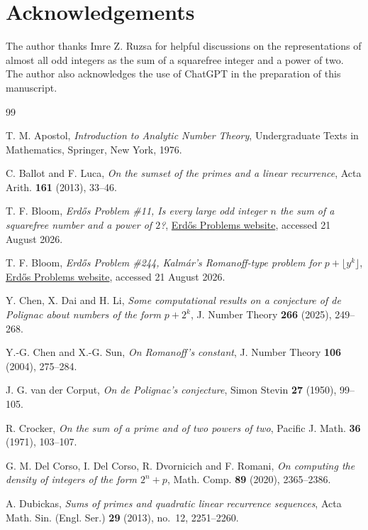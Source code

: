 \documentclass[11pt,reqno]{amsart}
\numberwithin{equation}{section}
\begin{document}
    \section*{Acknowledgements}
    The author thanks Imre Z. Ruzsa for helpful discussions on the representations of almost all odd integers as the sum of a squarefree integer and a power of two. The author also acknowledges the use of ChatGPT in the preparation of this manuscript.

    \begin{thebibliography}{99}

    T. M. Apostol, \emph{Introduction to Analytic Number Theory}, Undergraduate Texts in Mathematics, Springer, New York, 1976.

    C. Ballot and F. Luca, \emph{On the sumset of the primes and a linear recurrence}, Acta Arith. \textbf{161} (2013), 33--46.

    T. F. Bloom, \emph{Erd\H{o}s Problem \#11, Is every large odd integer $n$ the sum of a squarefree number and a power of $2$?}, \href{https://www.erdosproblems.com/11}{Erd\H{o}s Problems website}, accessed 21 August 2026.

    T. F. Bloom, \emph{Erd\H{o}s Problem \#244, Kalm\'ar's Romanoff-type problem for $p+\lfloor y^k\rfloor$}, \href{https://www.erdosproblems.com/244}{Erd\H{o}s Problems website}, accessed 21 August 2026.

    Y. Chen, X. Dai and H. Li, \emph{Some computational results on a conjecture of de Polignac about numbers of the form $p+2^k$}, J. Number Theory \textbf{266} (2025), 249--268.

    Y.-G. Chen and X.-G. Sun, \emph{On Romanoff's constant}, J. Number Theory \textbf{106} (2004), 275--284.

    J. G. van der Corput, \emph{On de Polignac's conjecture}, Simon Stevin \textbf{27} (1950), 99--105.

    R. Crocker, \emph{On the sum of a prime and of two powers of two}, Pacific J. Math. \textbf{36} (1971), 103--107.

    G. M. Del Corso, I. Del Corso, R. Dvornicich and F. Romani, \emph{On computing the density of integers of the form $2^n+p$}, Math. Comp. \textbf{89} (2020), 2365--2386.

    A. Dubickas, \emph{Sums of primes and quadratic linear recurrence sequences}, Acta Math. Sin. (Engl. Ser.) \textbf{29} (2013), no.~12, 2251--2260.


\end{thebibliography}
\end{document}
